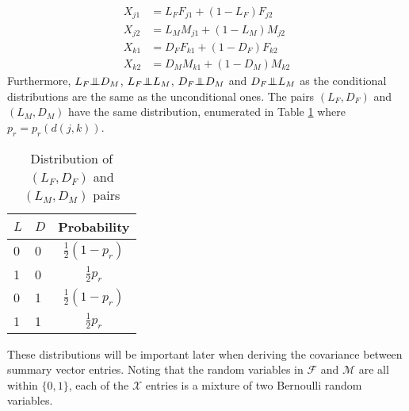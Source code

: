 \documentclass{article}
\newcommand{\indep}{\bot\hspace{-.6em}\bot}
\begin{document}
\begin{align*}
  X_{j1} & =  L_F F_{j1} + (1 - L_F) F_{j2} \\ %
  X_{j2} & =  L_M M_{j1} + (1 - L_M) M_{j2} \\ %
  X_{k1} & =  D_F F_{k1} + (1 - D_F) F_{k2} \\ %
  X_{k2} & =  D_M M_{k1} + (1 - D_M) M_{k2} %
\end{align*}
Furthermore, $L_F \indep D_M$, $L_F \indep L_M$, $D_F \indep D_M$ and $D_F \indep L_M$ as the conditional distributions are the same as the unconditional ones. The pairs $(L_F, D_F)$ and $(L_M, D_M)$ have the same distribution, enumerated in Table \ref{tab:jointLD} where $p_r = p_r(d(j,k))$.
\begin{table}[!h]
  \centering
  \begin{tabular}{l|l|c}
    $L$ & $D$ & Probability \\ \hline
    0 & 0 & $\frac{1}{2}(1 - p_r)$ \\
    1 & 0 & $\frac{1}{2} p_r$ \\
    0 & 1 & $\frac{1}{2}(1 - p_r)$ \\
    1 & 1 & $\frac{1}{2} p_r$ \\
  \end{tabular}
  \caption{Distribution of $(L_F, D_F)$ and $(L_M, D_M)$ pairs} \label{tab:jointLD}
\end{table}
These distributions will be important later when deriving the covariance between summary vector entries.
Noting that the random variables in $\mathcal{F}$ and $\mathcal{M}$ are all within $\{0,1\}$, each of the $\mathcal{X}$ entries is a mixture of two Bernoulli random variables.
\end{document}

